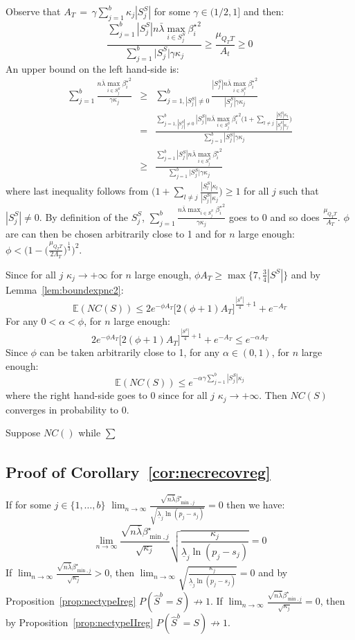 \documentclass[aos]{imsart}
\theoremstyle{plain}
\newcommand{\E}{\mathbb{E}}
\begin{document}
\begin{supplement}
Observe that $A_T\,=\,\gamma\sum_{j=1}^b \kappa_j|S^S_j|$ for some $\gamma\in(1/2,1]$ and then:
$$\frac{\sum_{j=1}^b|S_j^S|n\bar{\lambda}\max_{i\in S_j^S}{\beta_i^{\star}}^2}{\sum_{j=1}^b \big|S^S_j\big|\gamma\kappa_j}\geq \frac{\mu_{Q_TT}}{A_t} \geq 0$$
An upper bound on the left hand-side is:
\begin{eqnarray*}
    \sum_{j=1}^b\frac{n\bar{\lambda}\max_{i\in S_j^S}{\beta_i^{\star}}^2}{\gamma\kappa_j}
    &\geq &\sum_{j=1,|S_j^S|\neq 0}^b\frac{|S_j^S|n\bar{\lambda}\max_{i\in S_j^S}{\beta_i^{\star}}^2}{|S_j^S|\gamma\kappa_j} \\
    &=& \frac{\sum_{j=1,|S_j^S|\neq 0 }^b|S_j^S|n\bar{\lambda}\max_{i\in S_j^S}{\beta_i^{\star}}^2\Big(1+\sum_{l\neq j}\frac{|S_l^S|\kappa_l}{|S_j^S|\kappa_j}\Big)}{\sum_{j=1}^b|S_j^S|\gamma\kappa_j} \\
    &\geq & \frac{\sum_{j=1}^b|S_j^S|n\bar{\lambda}\max_{i\in S_j^S}{\beta_i^{\star}}^2}{\sum_{j=1}^b \big|S^S_j\big|\gamma\kappa_j} 
\end{eqnarray*}
where last inequality follows from $\Big(1+\sum_{l\neq j}\frac{|S_l^S|\kappa_l}{|S_j^S|\kappa_j}\Big)\geq 1$ for all $j$ such that $|S_j^S|\neq 0$. By definition of the $S_j^S$, $\sum_{j=1}^b\frac{n\bar{\lambda}\max_{i\in S_j^S}{\beta_i^{\star}}^2}{\gamma\kappa_j}$ goes to 0 and so does $\frac{\mu_{Q_TT}}{A_T}$. $\phi$ are can then be chosen arbitrarily close to 1 and for $n$ large enough: $\phi < \Big(1-\big(\frac{\mu_{Q_T T}}{2 \Lambda_T}\big)^{\frac{1}{3}}\Big)^2$. 

Since for all $j$ $\kappa_j \to +\infty$ for $n$ large enough, $\phi A_T \geq \max\{7,\frac{3}{4}|S^S|\}$ and by Lemma~\ref{lem:boundexpnc2}:
$$\E(NC(S))\leq 2e^{-\phi A_T}\big[2(\phi+1)A_T\big]^{\frac{|S^S|}{4}+1}+e^{-A_T}$$
For any $0<\alpha<\phi$, for $n$ large enough: 
$$2e^{-\phi A_T}\big[2(\phi+1)A_T\big]^{\frac{|S^S|}{4}+1}+e^{-A_T} \leq e^{-\alpha A_T}$$
Since $\phi$ can be taken arbitrarily close to 1, for any $\alpha\in(0,1)$, for $n$ large enough:
$$\E(NC(S))\leq e^{-\alpha\gamma \sum_{j=1}^b|S_j^S|\kappa_j}$$
where the right hand-side goes to 0 since for all $j$ $\kappa_j \to +\infty$. Then $NC(S)$ converges in probability to 0. 

Suppose $NC()$ while $\sum_{}$

\subsection{Proof of Corollary~\ref{cor:necrecovreg}}
If for some $j\in\{1,\ldots,b\}$ $\lim_{n\to\infty}\frac{\sqrt{n\bar{\lambda}}\beta_{\min,j}^{\star}}{\sqrt{\underline{\lambda}_j\ln(p_j-s_j)}} = 0$ then we have:
$$\lim_{n\to\infty}\frac{\sqrt{n\bar{\lambda}}\beta_{\min,j}^{\star}}{\sqrt{\kappa_j}}\sqrt{\frac{\kappa_j}{\underline{\lambda}_j\ln(p_j-s_j)}} = 0$$
If $\lim_{n\to\infty}\frac{\sqrt{n\bar{\lambda}}\beta_{\min,j}^{\star}}{\sqrt{\kappa_j}}>0$, then $\lim_{n\to\infty}\sqrt{\frac{\kappa_j}{\underline{\lambda}_j\ln(p_j-s_j)}} = 0$ and by Proposition~\ref{prop:nectypeIreg} $P(\hat{S}^b=S)\not\to1$. If $\lim_{n\to\infty}\frac{\sqrt{n\bar{\lambda}}\beta_{\min,j}^{\star}}{\sqrt{\kappa_j}}=0$, then by Proposition~\ref{prop:nectypeIIreg} $P(\hat{S}^b=S)\not\to1$.


\end{supplement}
\end{document}
